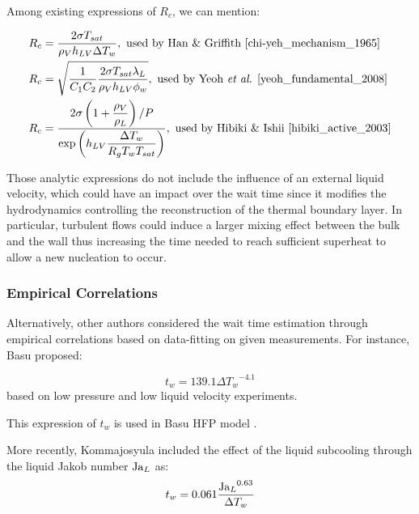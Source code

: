 \npar

Among existing expressions of $R_{c}$, we can mention:

\begin{align}
R_{c} &= \frac{2\sigma T_{sat}}{\rho_{V}h_{LV}\Delta T_{w}},\ \text{used by Han \& Griffith \cite{chi-yeh_mechanism_1965}}
\label{eq:rc_han}\\
%
R_{c} &= \sqrt{\dfrac{1}{C_{1}C_{2}} \dfrac{2 \sigma T_{sat} \lambda_{L}}{\rho_{V}h_{LV}\phi_{w}}}, \ \text{used by Yeoh \etal \cite{yeoh_fundamental_2008}}
\label{eq:rc_yeoh}\\
%
R_{c} &= \frac{2\sigma\parth{1+ \dfrac{\rho_{V}}{\rho_{L}} } / P}{\exp{h_{LV} \dfrac{\Delta T_{w}}{R_{g}T_{w}T_{sat}} }}, \ \text{used by Hibiki \& Ishii \cite{hibiki_active_2003}}
\label{eq:rc_hibiki}
\end{align}

\begin{remark*}{}
Those analytic expressions do not include the influence of an external liquid velocity, which could have an impact over the wait time since it modifies the hydrodynamics controlling the reconstruction of the thermal boundary layer. In particular, turbulent flows could induce a larger mixing effect between the bulk and the wall thus increasing the time needed to reach sufficient superheat to allow a new nucleation to occur.
\end{remark*}



\subsubsection{Empirical Correlations}

Alternatively, other authors considered the wait time estimation through empirical correlations based on data-fitting on given measurements. For instance, Basu \etal \cite{basu_wall_2005} proposed:

\begin{equation}
t_{w} = 139.1\Delta {T_{w}}^{-4.1}
\end{equation}
based on low pressure and low liquid velocity experiments.

\begin{note*}{}
This expression of $t_{w}$ is used in Basu \etal HFP model \cite{basu_wall_2005}.
\end{note*}


\npar

More recently, Kommajosyula \cite{kommajosyula_development_2020} included the effect of the liquid subcooling through the liquid Jakob number $\mathrm{Ja}_{L}$ as:
\begin{equation}
t_{w} = 0.061\frac{{\mathrm{Ja}_{L}}^{0.63}}{\Delta T_{w}}
\end{equation}

